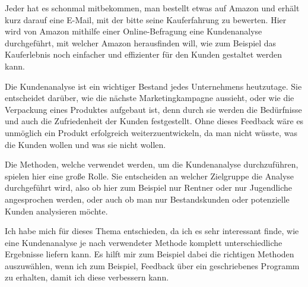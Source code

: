 \begin{refsection}
  
Jeder hat es schonmal mitbekommen, man bestellt etwas auf Amazon und erhält kurz darauf eine E-Mail, mit der bitte seine Kauferfahrung zu bewerten. Hier wird von Amazon mithilfe einer Online-Befragung eine Kundenanalyse durchgeführt, mit welcher Amazon herausfinden will, wie zum Beispiel das Kauferlebnis noch einfacher und effizienter für den Kunden gestaltet werden kann. 

Die Kundenanalyse ist ein wichtiger Bestand jedes Unternehmens heutzutage. Sie entscheidet darüber, wie die nächste Marketingkampagne aussieht, oder wie die Verpackung eines Produktes aufgebaut ist, denn durch sie werden die Bedürfnisse und auch die Zufriedenheit der Kunden festgestellt. Ohne dieses Feedback wäre es unmöglich ein Produkt erfolgreich weiterzuentwickeln, da man nicht wüsste, was die Kunden wollen und was sie nicht wollen.

Die Methoden, welche verwendet werden, um die Kundenanalyse durchzuführen, spielen hier eine gro\ss{}e Rolle. Sie entscheiden an welcher Zielgruppe die Analyse durchgeführt wird, also ob hier zum Beispiel nur Rentner oder nur Jugendliche angesprochen werden, oder auch ob man nur Bestandskunden oder potenzielle Kunden analysieren möchte.

Ich habe mich für dieses Thema entschieden, da ich es sehr interessant finde, wie eine Kundenanalyse je nach verwendeter Methode komplett unterschiedliche Ergebnisse liefern kann. Es hilft mir zum Beispiel dabei die richtigen Methoden auszuwählen, wenn ich zum Beispiel, Feedback über ein geschriebenes Programm zu erhalten, damit ich diese verbessern kann.
  \clearpage
  \printbibliography[heading=subsubbibliography]
\end{refsection}
\clearpage
